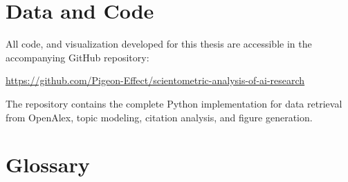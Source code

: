 \documentclass{article}
\begin{document}
	
	
	\section{Data and Code}
	
	All code, and visualization developed for this thesis are accessible in the accompanying GitHub repository:
	
	\begin{center}
		\url{https://github.com/Pigeon-Effect/scientometric-analysis-of-ai-research}
	\end{center}
	
	The repository contains the complete Python implementation for data retrieval from OpenAlex, topic modeling, citation analysis, and figure generation.
	
	\newpage
	\onecolumn
	\section{Glossary}
	
\end{document}
